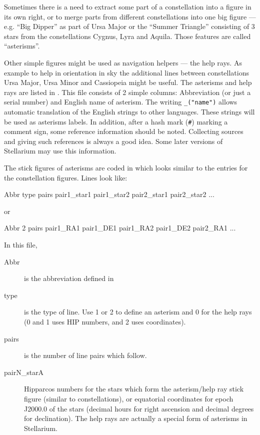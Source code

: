 \noindent{}Sometimes there is a need to extract some part of a 
constellation into a figure in its own right, or to merge parts from different 
constellations into one big figure --- e.g. ``Big Dipper'' as part of Ursa Major or the 
``Summer Triangle'' consisting of 3 stars from the constellations Cygnus, Lyra and Aquila. 
Those features are called ``asterisms''. 

Other simple figures might be used as navigation helpers --- the help rays. 
As example to help in orientation in sky the additional lines between constellations 
Ursa Major, Ursa Minor and Cassiopeia might be useful. The asterisms and help rays are listed in
. This file consists of 2 simple columns:
Abbreviation (or just a serial number) and English
name of asterism. The writing \texttt{\_("name")} allows automatic
translation of the English strings to other languages. These strings
will be used as asterisms labels. In addition, after a hash mark (\texttt{\#}) marking a comment sign, 
some reference information should be noted. Collecting sources and giving such references 
is always a good idea. Some later versions of Stellarium may use this information.

The stick figures of asterisms are coded in 
which looks similar to the entries for the constellation
figures. Lines look like:

\begin{configfile}
Abbr type pairs pair1_star1 pair1_star2 pair2_star1 pair2_star2 ...
\end{configfile}
or
\begin{configfile}
Abbr 2 pairs pair1_RA1 pair1_DE1 pair1_RA2 pair1_DE2 pair2_RA1 ...
\end{configfile}
In this file,
\begin{description}
\item[Abbr] is the abbreviation defined in 
\item[type] is the type of line. Use 1 or 2 to define an asterism and 0 for the help rays (0 and 1 uses HIP numbers, and 2 uses coordinates).
\item[pairs] is the number of line pairs which follow.
\item[pairN\_starA] Hipparcos numbers for the stars which form the asterism/help ray stick figure (similar to constellations),
  or equatorial coordinates for epoch J2000.0 of the stars (decimal hours for right ascension and decimal degrees for declination).
  The help rays are actually a special form of asterisms in Stellarium. 
\end{description}


